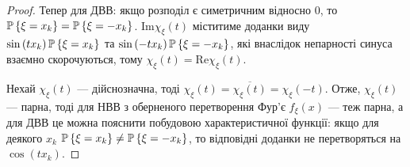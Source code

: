 \begin{enumerate}
\begin{proof}
        Тепер для ДВВ: якщо розподіл є симетричним відносно 0, то $\P\left\{\xi = x_k\right\} = \P\left\{\xi = -x_k\right\}$.
        $\mathrm{Im}\chi_\xi(t)$ міститиме доданки виду $\sin\left(t x_k\right) \P\left\{\xi = x_k\right\}$ та
        $\sin\left(-t x_k\right) \P\left\{\xi = -x_k\right\}$, які внаслідок непарності синуса взаємно скорочуються,
        тому $\chi_\xi(t) = \mathrm{Re}\chi_\xi(t)$.

        Нехай $\chi_\xi(t)$ --- дійснозначна, тоді $\chi_\xi(t) = \overline{\chi_\xi(t)} = \chi_\xi(-t)$.
        Отже, $\chi_\xi(t)$ --- парна, тоді для НВВ з оберненого перетворення Фур'є $f_\xi(x)$ --- теж парна,
        а для ДВВ це можна пояснити побудовою характеристичної функції: якщо для деякого $x_k$
        $\P\left\{\xi = x_k\right\} \neq \P\left\{\xi = -x_k\right\}$, то відповідні доданки не перетворяться на $\cos(t x_k)$.
    \end{proof}
\end{enumerate}

